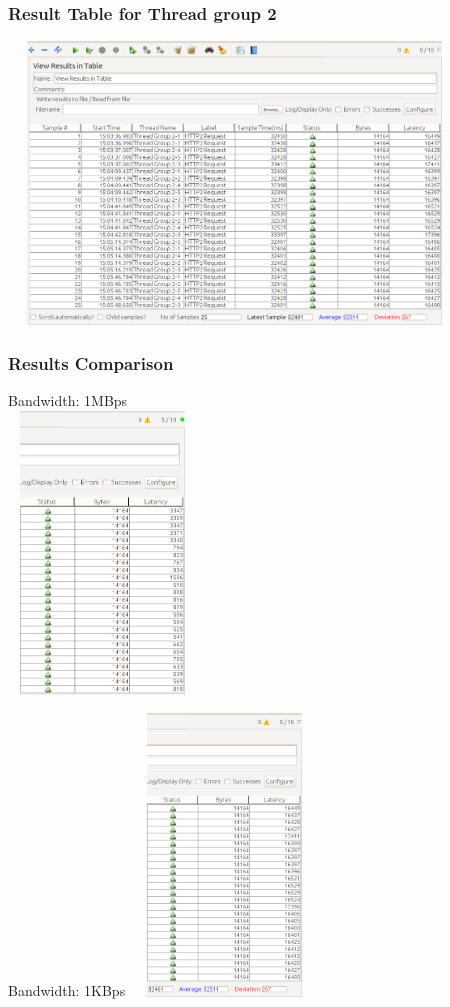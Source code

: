 \documentclass[12pt]{beamer}
\begin{document}
  \begin{frame}[c]
  \frametitle{Result Table for Thread group 2}
  \includegraphics[width=12cm, height=7.5cm]{images/bt6}
 \end{frame}

 \begin{frame}[c]	
 \frametitle{Results Comparison}
 \begin{minipage}[t]{0.48\linewidth}
 Bandwidth: 1MBps\\
  \centering
   \includegraphics[width=5cm, height=7.5cm]{images/bt7}
 \end{minipage}
 \begin{minipage}[t]{0.48\linewidth}
  \centering
  Bandwidth: 1KBps
   \includegraphics[width=5cm, height=7.5cm]{images/bt8}
 \end{minipage}

 \end{frame}
 
\end{document}
